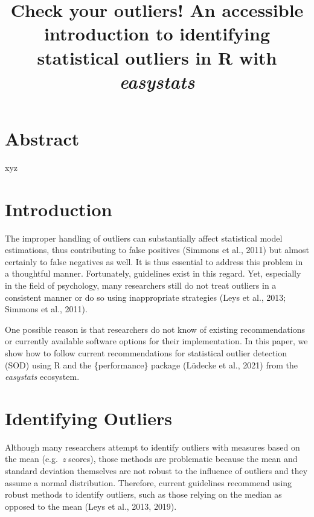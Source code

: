 \documentclass[
]{article}
\title{Check your outliers! An accessible introduction to identifying statistical outliers in R with \emph{easystats}}
\author{}
\date{\vspace{-2.5em}}
\begin{document}
\maketitle

\hypertarget{abstract}{%
\section{Abstract}\label{abstract}}

xyz

\hypertarget{introduction}{%
\section{Introduction}\label{introduction}}

The improper handling of outliers can substantially affect statistical model estimations, thus contributing to false positives (Simmons et al., 2011) but almost certainly to false negatives as well. It is thus essential to address this problem in a thoughtful manner. Fortunately, guidelines exist in this regard. Yet, especially in the field of psychology, many researchers still do not treat outliers in a consistent manner or do so using inappropriate strategies (Leys et al., 2013; Simmons et al., 2011).

One possible reason is that researchers do not know of existing recommendations or currently available software options for their implementation. In this paper, we show how to follow current recommendations for statistical outlier detection (SOD) using R and the \{performance\} package (Lüdecke et al., 2021) from the \emph{easystats} ecosystem.

\hypertarget{identifying-outliers}{%
\section{Identifying Outliers}\label{identifying-outliers}}

Although many researchers attempt to identify outliers with measures based on the mean (e.g.~\emph{z} scores), those methods are problematic because the mean and standard deviation themselves are not robust to the influence of outliers and they assume a normal distribution. Therefore, current guidelines recommend using robust methods to identify outliers, such as those relying on the median as opposed to the mean (Leys et al., 2013, 2019).
\end{document}
